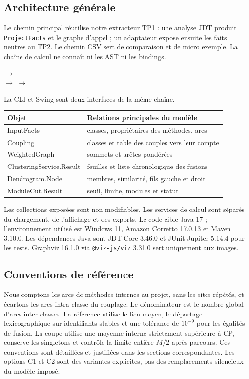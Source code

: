 \documentclass[11pt,a4paper]{article}
\begin{document}
\subsection{Architecture générale}
Le chemin principal réutilise notre extracteur TP1 : une analyse JDT produit
\texttt{ProjectFacts} et le graphe d'appel ; un adaptateur expose ensuite les
faits neutres au TP2. Le chemin CSV sert de comparaison et de micro exemple.
La chaîne de calcul ne connaît ni les AST ni les bindings.
\begin{center}
$\longrightarrow$ \\[1em]
$\longrightarrow$ 
$\longrightarrow$ 
\end{center}
La CLI et Swing sont deux interfaces de la même chaîne.
\begin{center}
\begin{tabular}{ll}
Objet & Relations principales du modèle \\
\hline
InputFacts & classes, propriétaires des méthodes, arcs \\
Coupling & classes et table des couples vers leur compte \\
WeightedGraph & sommets et arêtes pondérées \\
ClusteringService.Result & feuilles et liste chronologique des fusions \\
Dendrogram.Node & membres, similarité, fils gauche et droit \\
ModuleCut.Result & seuil, limite, modules et statut
\end{tabular}
\end{center}
Les collections exposées sont non modifiables. Les services de calcul sont
séparés du chargement, de l'affichage et des exports. Le code cible Java 17 ;
l'environnement utilisé est Windows 11, Amazon Corretto 17.0.13 et Maven 3.10.0.
Les dépendances Java sont JDT Core 3.46.0 et JUnit Jupiter 5.14.4 pour les tests.
Graphviz 16.1.0 via \texttt{@viz-js/viz} 3.31.0 sert uniquement aux images.

\subsection{Conventions de référence}
Nous comptons les arcs de méthodes internes au projet, sans les sites répétés,
et écartons les arcs intra-classe du couplage. Le dénominateur est le nombre
global d'arcs inter-classes. La référence utilise le lien moyen, le départage
lexicographique sur identifiants stables et une tolérance de $10^{-9}$ pour les
égalités de fusion. La coupe utilise une moyenne interne strictement supérieure
à CP, conserve les singletons et contrôle la limite entière $M/2$ après parcours.
Ces conventions sont détaillées et justifiées dans les sections correspondantes.
Les options C1 et C2 sont des variantes explicites, pas des remplacements
silencieux du modèle imposé.
\end{document}
